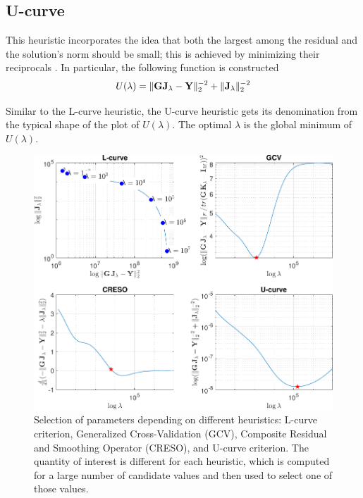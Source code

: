 \subsection{U-curve}

This heuristic incorporates the idea that both the largest among the residual and the solution's norm should be small; this is achieved by minimizing their reciprocals \cite{Ucurve}.
%
In particular, the following function is constructed
\begin{equation}
U(\lambda) = 
\lVert \mathbf{G}\mathbf{J}_\lambda - \mathbf{Y} \rVert_2^{-2} + \lVert \mathbf{J}_\lambda \rVert_2^{-2}
\end{equation}

Similar to the L-curve heuristic, the U-curve heuristic gets its denomination from the typical shape of the plot of $U(\lambda)$.
%
The optimal $\lambda$ is the global minimum of $U(\lambda)$.

\begin{figure}
\centering
\includegraphics[width=1\linewidth]{./img_MATLAB/ParTuning_sLORETA}
\caption{Selection of parameters depending on different heuristics: L-curve criterion, Generalized Cross-Validation (GCV), Composite Residual and Smoothing Operator (CRESO), and U-curve criterion. The quantity of interest is different for each heuristic, which is computed for a large number of candidate values and then used to select one of those values.}
\end{figure}


